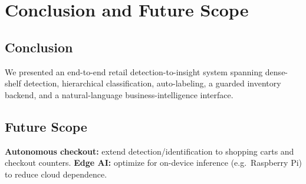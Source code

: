 \section{Conclusion and Future Scope}
\subsection{Conclusion}
We presented an end-to-end retail detection-to-insight system spanning dense-shelf detection,
hierarchical classification, auto-labeling, a guarded inventory backend, and a natural-language
business-intelligence interface.

\subsection{Future Scope}
\textbf{Autonomous checkout:} extend detection/identification to shopping carts and checkout
counters. \textbf{Edge AI:} optimize for on-device inference (e.g.\ Raspberry Pi) to reduce cloud
dependence.
